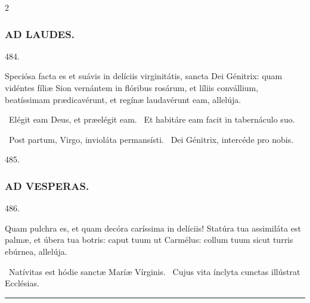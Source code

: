 \documentclass[9pt,twoside]{extarticle}
\begin{document}
\begin{multicols}{2}
\subsubsection*{\center \textsc{AD LAUDES.}}
\begin{tightlist}{}
\item {} 484.
\item {} Speciósa facta es et suávis in delíciis virginitátis, sancta Dei Génitrix: quam vidéntes fíliæ Sion vernántem in flóribus rosárum, et líliis convállium, beatíssimam prædicavérunt, et regínæ laudavérunt eam, allelúja.
\item {}~Elégit eam Deus, et præelégit eam. ~Et habitáre eam facit in tabernáculo suo.
\item {}~Post partum, Virgo, invioláta permansísti. ~Dei Génitrix, intercéde pro nobis.
\item {} 485.
\end{tightlist}

\subsubsection*{\center \textsc{AD VESPERAS.}}
\begin{tightlist}{}
\item {} 486.
\item {} Quam pulchra es, et quam decóra caríssima in delíciis! Statúra tua assimiláta est palmæ, et úbera tua botris: caput tuum ut Carmélus: collum tuum sicut turris ebúrnea, allelúja.
\item {}~Natívitas est hódie sanctæ Maríæ Vírginis. ~Cujus vita ínclyta cunctas illústrat Ecclésias.
\end{tightlist}

\begin{center}\textcolor{red}{\rule{\linewidth}{0.5pt}} \end{center}

\subsection*{\center {}}
\subsubsection*{\center {}}

\end{multicols}
\end{document}
